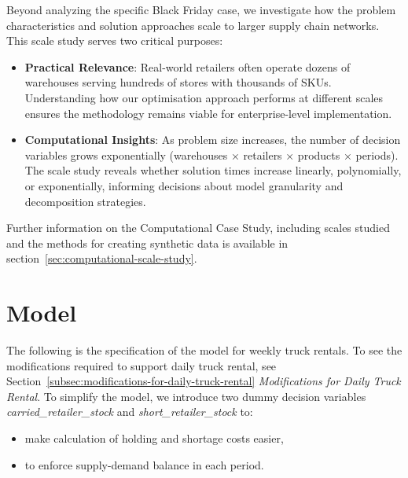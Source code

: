 \documentclass[a4paper,12pt]{article}
\begin{document}
Beyond analyzing the specific Black Friday case, we investigate how the problem characteristics and solution approaches scale to larger supply chain networks.
This scale study serves two critical purposes:
\begin{itemize}
    \item \textbf{Practical Relevance}: Real-world retailers often operate dozens of warehouses serving hundreds of stores with thousands of SKUs.
    Understanding how our optimisation approach performs at different scales ensures the methodology remains viable for enterprise-level implementation.

    \item \textbf{Computational Insights}: As problem size increases, the number of decision variables grows exponentially (warehouses × retailers × products × periods).
    The scale study reveals whether solution times increase linearly, polynomially, or exponentially, informing decisions about model granularity and decomposition strategies.
\end{itemize}


Further information on the Computational Case Study, including scales studied and the methods for creating synthetic data is available in section~\ref{sec:computational-scale-study}.





\section{Model}\label{sec:model}

The following is the specification of the model for weekly truck rentals.
To see the modifications required to support daily truck rental, see Section~\ref{subsec:modifications-for-daily-truck-rental} \textit{Modifications for Daily Truck Rental}.
To simplify the model, we introduce two dummy decision variables \textit{carried\_retailer\_stock} and \textit{short\_retailer\_stock} to:
\begin{itemize}
    \item make calculation of holding and shortage costs easier,
    \item to enforce supply-demand balance in each period.
\end{itemize}
\end{document}
